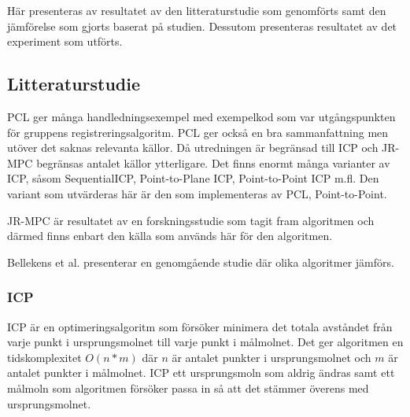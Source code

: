 Här presenteras av resultatet av den litteraturstudie som genomförts samt den jämförelse som gjorts baserat på studien. Dessutom presenteras resultatet av det experiment som utförts.

\subsection{Litteraturstudie}
PCL \cite{pcl_home} ger många handledningsexempel med exempelkod som var utgångspunkten för gruppens registreringsalgoritm. PCL ger också en bra sammanfattning men utöver det saknas relevanta källor. Då utredningen är begränsad till ICP och JR-MPC begränsas antalet källor ytterligare. Det finns enormt många varianter av ICP, såsom SequentialICP, Point-to-Plane ICP, Point-to-Point ICP m.fl. Den variant som utvärderas här är den som implementeras av PCL, Point-to-Point. 

JR-MPC \cite{Evangelidis-ECCV-2014} är resultatet av en forskningsstudie som tagit fram algoritmen och därmed finns enbart den källa som används här för den algoritmen.

Bellekens et al. \cite{beller2014modern} presenterar en genomgående studie där olika algoritmer jämförs. 

\subsubsection{ICP}
\label{sec:icp-karlsson}
ICP är en optimeringsalgoritm som försöker minimera det totala avståndet från varje punkt i ursprungsmolnet till varje punkt i målmolnet. Det ger algoritmen en tidskomplexitet $ \mathit{O(n*m)} $ där $ \mathit{n} $ är antalet punkter i ursprungsmolnet och $ \mathit{m} $ är antalet punkter i målmolnet. ICP ett ursprungsmoln som aldrig ändras samt ett målmoln som algoritmen försöker passa in så att det stämmer överens med ursprungsmolnet. 

